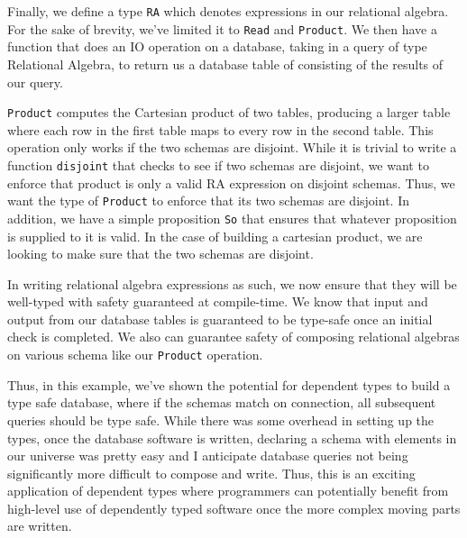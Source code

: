Finally, we define a type \texttt{RA} which denotes expressions in our
relational algebra. For the sake of brevity, we've limited it to \texttt{Read}
and \texttt{Product}. We then have a function that does an IO operation on a
database, taking in a query of type Relational Algebra, to return us a database
table of consisting of the results of our query. 

\texttt{Product} computes the Cartesian product of two tables, producing a
larger table where each row in the first table maps to every row in the second
table. This operation only works if the two schemas are disjoint. While it is
trivial to write a function \texttt{disjoint} that checks to see if two schemas
are disjoint, we want to enforce that product is only a valid RA expression on
disjoint schemas. Thus, we want the type of \texttt{Product} to enforce that its
two schemas are disjoint. In addition, we have a simple proposition \texttt{So}
that ensures that whatever proposition is supplied to it is valid. In the case
of building a cartesian product, we are looking to make sure that the two
schemas are disjoint. 

In writing relational algebra expressions as such, we now ensure that they will
be well-typed with safety guaranteed at compile-time. We know that input and
output from our database tables is guaranteed to be type-safe once an initial
check is completed. We also can guarantee safety of composing relational
algebras on various schema like our \texttt{Product} operation. 

Thus, in this example, we've shown the potential for dependent types to build a
type safe database, where if the schemas match on connection, all subsequent
queries should be type safe. While there was some overhead in setting up the
types, once the database software is written, declaring a schema with elements
in our universe was pretty easy and I anticipate database queries not being
significantly more difficult to compose and write. Thus, this is an exciting
application of dependent types where programmers can potentially benefit from
high-level use of dependently typed software once the more complex moving parts
are written. 

